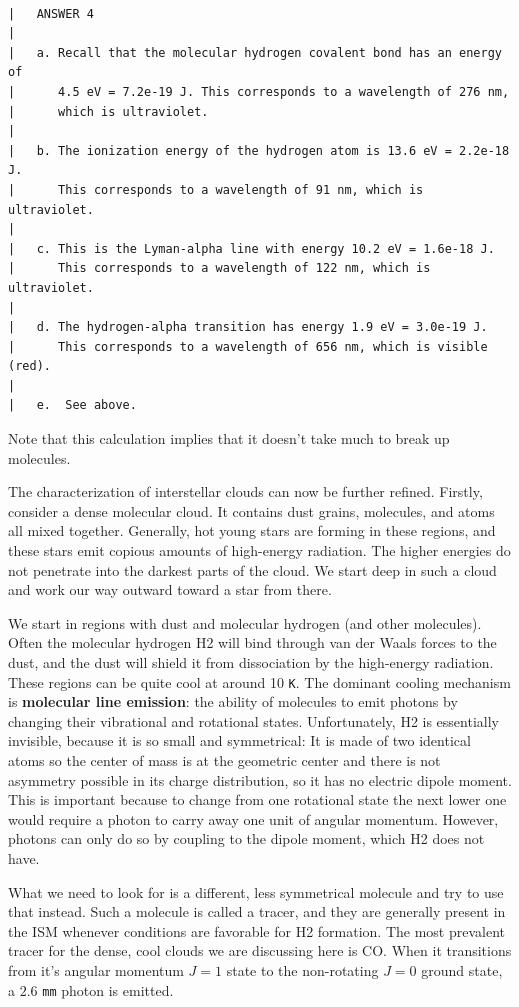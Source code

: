 \documentclass[11pt]{article}
\begin{document}
    \begin{Verbatim}[commandchars=\\\{\}]

|   ANSWER 4
|
|   a. Recall that the molecular hydrogen covalent bond has an energy of
|      4.5 eV = 7.2e-19 J. This corresponds to a wavelength of 276 nm,
|      which is ultraviolet.
|
|   b. The ionization energy of the hydrogen atom is 13.6 eV = 2.2e-18 J.
|      This corresponds to a wavelength of 91 nm, which is ultraviolet.
|
|   c. This is the Lyman-alpha line with energy 10.2 eV = 1.6e-18 J.
|      This corresponds to a wavelength of 122 nm, which is ultraviolet.
|
|   d. The hydrogen-alpha transition has energy 1.9 eV = 3.0e-19 J.
|      This corresponds to a wavelength of 656 nm, which is visible (red).
|
|   e.  See above.

    \end{Verbatim}

    Note that this calculation implies that it doesn't take much to break up
molecules.

The characterization of interstellar clouds can now be further refined.
Firstly, consider a dense molecular cloud. It contains dust grains,
molecules, and atoms all mixed together. Generally, hot young stars are
forming in these regions, and these stars emit copious amounts of
high-energy radiation. The higher energies do not penetrate into the
darkest parts of the cloud. We start deep in such a cloud and work our
way outward toward a star from there.

We start in regions with dust and molecular hydrogen (and other
molecules). Often the molecular hydrogen H2 will bind through van der
Waals forces to the dust, and the dust will shield it from dissociation
by the high-energy radiation. These regions can be quite cool at around
10 \texttt{K}. The dominant cooling mechanism is \textbf{molecular line
emission}: the ability of molecules to emit photons by changing their
vibrational and rotational states. Unfortunately, H2 is essentially
invisible, because it is so small and symmetrical: It is made of two
identical atoms so the center of mass is at the geometric center and
there is not asymmetry possible in its charge distribution, so it has no
electric dipole moment. This is important because to change from one
rotational state the next lower one would require a photon to carry away
one unit of angular momentum. However, photons can only do so by
coupling to the dipole moment, which H2 does not have.

What we need to look for is a different, less symmetrical molecule and
try to use that instead. Such a molecule is called a tracer, and they
are generally present in the ISM whenever conditions are favorable for
H2 formation. The most prevalent tracer for the dense, cool clouds we
are discussing here is CO. When it transitions from it's angular
momentum \(J=1\) state to the non-rotating \(J=0\) ground state, a
\(2.6\) \texttt{mm} photon is emitted.
\end{document}
